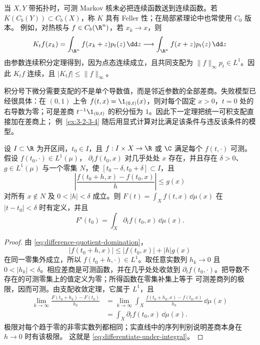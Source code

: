 \begin{remark}[Feller 性]
当 $X,Y$ 带拓扑时，可测 Markov 核未必把连续函数送到连续函数。若
$K(C_b(Y))\subset C_b(X)$，称 $K$ 具有 Feller 性；在局部紧理论中也常使用 $C_0$ 版本。
例如，对热核与 $f\in C_b(\R^n)$，若 $x_k\to x$，则
\[
 K_tf(x_k)=\int_{\R^n}f(x_k+z)p_t(z)\,\dd z
 \longrightarrow\int_{\R^n}f(x+z)p_t(z)\,\dd z
\]
由参数连续积分定理得到，因为点态连续成立，且共同支配为
$\|f\|_\infty p_t\in L^1$。因此 $K_tf$ 连续，且
$|K_tf|\le\|f\|_\infty$。
\end{remark}

积分号下微分需要支配的不是单个导数值，而是邻近参数的全部差商。失败模型已经很具体：在
$(0,1)$ 上令 $f(t,x)=\1_{(0,t)}(x)$，则对每个固定 $x>0$，$t=0$ 处的右导数为零；可是差商
$t^{-1}\1_{(0,t)}$ 的积分恒为 $1$。因此下一定理把统一可积支配直接加在差商上；
例~\ref{ex:3-2-3-4} 随后用显式计算对比满足该条件与违反该条件的模型。

\begin{theorem}[积分号下微分]\label{theorem:3-2-3-4}
设 $I\subset\R$ 为开区间，$t_0\in I$，且 $f:I\times X\to\R$ 或 $\C$ 满足每个
$f(t,\cdot)$ 可测。假设 $f(t_0,\cdot)\in L^1(\mu)$，
$\partial_tf(t_0,x)$ 对几乎处处 $x$ 存在，并且存在 $\delta>0$、$g\in L^1(\mu)$ 与一个零集
$N$，使 $[t_0-\delta,t_0+\delta]\subset I$，且
\[
 \left|\frac{f(t_0+h,x)-f(t_0,x)}{h}\right|\le g(x)
 \tag{3.2.20}\label{eq:difference-quotient-domination}
\]
对所有 $x\notin N$ 及 $0<|h|<\delta$ 成立。则 $F(t)=\int_Xf(t,x)\,\dd\mu(x)$
在 $|t-t_0|<\delta$ 时有定义，并且
\[
 F'(t_0)=\int_X\partial_tf(t_0,x)\,\dd\mu(x).
 \tag{3.2.21}\label{eq:differentiate-under-integral}
\]
\end{theorem}

\begin{proof}
由 \eqref{eq:difference-quotient-domination}，
\[
 |f(t_0+h,x)|\le|f(t_0,x)|+|h|g(x)
\]
在同一零集外成立，所以 $f(t_0+h,\cdot)\in L^1$。取任意实数列
$h_k\to0$ 且 $0<|h_k|<\delta$。相应差商是可测函数，并在几乎处处收敛到
$\partial_tf(t_0,\cdot)$。把导数不存在的可测零集上的值定义为零；所得函数在零集补集上等于
可测差商列的极限，因而可测。由支配收敛定理，它属于
$L^1$，且
\[
 \begin{aligned}
 \lim_{k\to\infty}\frac{F(t_0+h_k)-F(t_0)}{h_k}
 &=\lim_{k\to\infty}\int_X
 \frac{f(t_0+h_k,x)-f(t_0,x)}{h_k}\,\dd\mu(x)\\
 &=\int_X\partial_tf(t_0,x)\,\dd\mu(x).
 \end{aligned}
\]
极限对每个趋于零的非零实数列都相同；实直线中的序列判别说明差商本身在 $h\to0$ 时有该极限。
这就是 \eqref{eq:differentiate-under-integral}。
\end{proof}

